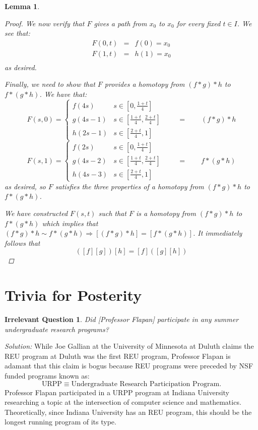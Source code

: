 \documentclass[reqno]{amsart}
\newtheorem{lemma}[theorem]{Lemma}
\newtheorem{irrevquestion}[theorem]{Irrelevant Question}
\newenvironment{solution}{\medskip\emph{Solution: }}{\medskip}
\begin{document}
\begin{lemma}
\begin{proof}
We now verify that $F$ gives a path from $x_0$ to $x_0$ for every fixed $t\in I$. We see that:
\begin{eqnarray*} 
 F(0,t) & = & f(0) = x_0\\
 F(1,t) & = & h(1) = x_0\\
\end{eqnarray*}
as desired.

Finally, we need to show that $F$ provides a homotopy from $(f*g)*h$ to $f*(g*h)$. We have that:
\[F(s,0) = \begin{cases}f\left(4s \right)& s \in \left[ 0,\frac{1+t}4 \right] \\
g(4s-1) & s\in \left[\frac{1+t}4, \frac{2+t}4\right]  \\ 
h\left(2s - 1 \right) & s\in \left[\frac{2+t}4,1\right]\end{cases}\qquad = \qquad (f*g)*h \]
\[F(s,1) = \begin{cases}f\left(2s  \right)& s \in \left[ 0,\frac{1+t}4 \right] \\
g(4s-2) & s\in \left[\frac{1+t}4, \frac{2+t}4\right]  \\ 
h\left(4s - 3 \right) & s\in \left[\frac{2+t}4,1\right]\end{cases}\qquad = \qquad f* (g*h)\]
as desired, so $F$ satisfies the three properties of a homotopy from $(f*g)*h$ to $f*(g*h)$.

We have constructed $F(s,t)$ such that $F$ is a homotopy from $(f*g)*h$ to $f*(g*h)$ which implies that $(f*g)*h \sim f*(g*h) \Rightarrow [(f*g)*h] = [f*(g*h)]$. It immediately follows that
\[ ([f][g])[h] = [f]([g][h])\]
\end{proof}
\end{lemma}

\section{Trivia for Posterity}

\begin{irrevquestion}
Did [Professor Flapan] participate in any summer undergraduate research programs?
\end{irrevquestion}

\begin{solution}
While Joe Gallian at the University of Minnesota at Duluth claims the REU program at Duluth was the first REU program, Professor Flapan is adamant that this claim is bogus because REU programs were preceded by NSF funded programs known as:
\[\text{URPP} \equiv \text{Undergraduate Research Participation Program}.\]
Professor Flapan participated in a URPP program at Indiana University researching a topic at the intersection of computer science and mathematics. Theoretically, since Indiana University has an REU program, this should be the longest running program of its type.
\end{solution}
\end{document}
